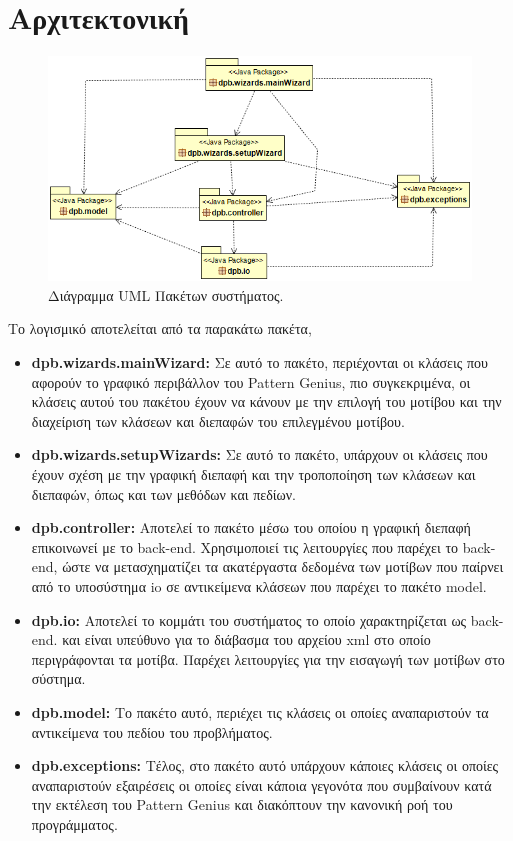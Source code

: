 \section{Αρχιτεκτονική}
\label{sec:packages}
\begin{figure}[H]
    \centering
    \includegraphics[width=1.0\textwidth]{Figures/packages.png}
    \caption{Διάγραμμα UML Πακέτων συστήματος.}
    \label{fig:packageUML}
\end{figure}
\par
Το λογισμικό αποτελείται από τα παρακάτω πακέτα,
\begin{itemize}
    \item \textbf{dpb.wizards.mainWizard:} Σε αυτό το πακέτο, περιέχονται οι κλάσεις που αφορούν το γραφικό περιβάλλον του Pattern Genius,
     πιο συγκεκριμένα, οι κλάσεις αυτού του πακέτου έχουν να κάνουν με την επιλογή του μοτίβου και την διαχείριση των κλάσεων και διεπαφών του 
     επιλεγμένου μοτίβου.
    \item \textbf{dpb.wizards.setupWizards:} Σε αυτό το πακέτο, υπάρχουν οι κλάσεις που έχουν σχέση με την γραφική διεπαφή και την τροποποίηση των κλάσεων και διεπαφών, 
    όπως και των μεθόδων και πεδίων.
    \item \textbf{dpb.controller:} Αποτελεί το πακέτο μέσω του οποίου η γραφική διεπαφή επικοινωνεί με το back-end. Χρησιμοποιεί τις λειτουργίες που παρέχει το back-end, 
    ώστε να  μετασχηματίζει τα ακατέργαστα δεδομένα των μοτίβων που παίρνει από το υποσύστημα io σε αντικείμενα κλάσεων που παρέχει το πακέτο model.
    \item \textbf{dpb.io:} Αποτελεί το κομμάτι του συστήματος το οποίο χαρακτηρίζεται ως back-end.
     και είναι υπεύθυνο για το διάβασμα του αρχείου xml στο οποίο περιγράφονται τα μοτίβα. 
     Παρέχει λειτουργίες για την εισαγωγή των μοτίβων στο σύστημα.
    \item \textbf{dpb.model:} Το πακέτο αυτό, περιέχει τις κλάσεις οι οποίες αναπαριστούν τα αντικείμενα του πεδίου του προβλήματος.
    \item \textbf{dpb.exceptions:} Τέλος, στο πακέτο αυτό υπάρχουν κάποιες κλάσεις οι οποίες αναπαριστούν εξαιρέσεις 
        οι οποίες είναι κάποια γεγονότα που συμβαίνουν κατά την εκτέλεση του Pattern Genius και διακόπτουν την κανονική ροή του προγράμματος.
\end{itemize}
